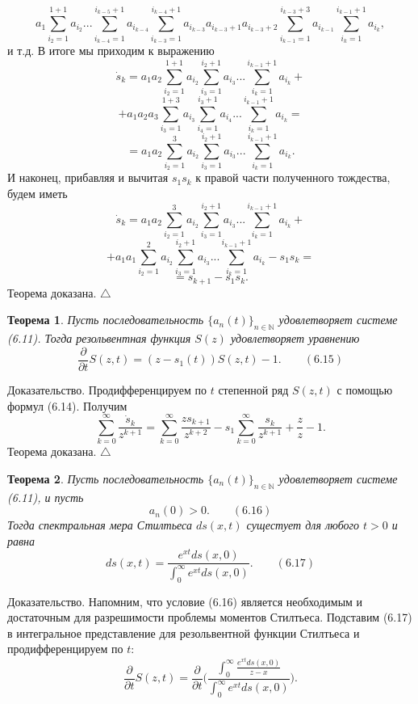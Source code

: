\documentclass[12pt,a4paper]{article}
\theoremstyle{plain}   \newtheorem{Pro}{Задача}
\newtheorem{The}{Теорема}
\begin{document}
$$
  a_1 \sum _{i_2 =1}^{1+1}a_{i_2}...
    \sum _{i_{k-4}=1}^{i_{k-5}+1}a_{i_{k-4}}
	  \sum _{i_{k-3}=1}^{i_{k-4}+1}
	    a_{i_{k-3}}a_{i_{k-3}+1}a_{i_{k-3}+2}
		  \sum _{i_{k-1}=1}^{i_{k-3}+3}a_{i_{k-1}}
		    \sum _{i_k =1}^{i_{k-1}+1}a_{i_k},
$$
и т.д. В итоге мы приходим к выражению
$$
  \dot s_k =a_1 a_2
    \sum _{i_2 =1}^{1+1}a_{i_2}
	  \sum _{i_3 =1}^{i_2 +1}a_{i_3}...
	    \sum _{i_k =1}^{i_{k-1}+1}a_{i_k}+
$$
$$
  +a_1 a_2 a_3
    \sum _{i_3 =1}^{1+3}a_{i_3}
	  \sum _{i_4 =1}^{i_3 +1}a_{i_4}...
	    \sum _{i_k =1}^{i_{k-1}+1}a_{i_k}=
$$
$$
  =a_1 a_2 \sum _{i_2 =1}^{3}a_{i_2}
    \sum _{i_3 =1}^{i_2 +1}a_{i_3}...
	  \sum _{i_k =1}^{i_{k-1}+1}a_{i_k}.
$$
И наконец, прибавляя и вычитая
$ s_1 s_k $
к правой части полученного тождества,
будем иметь
$$
  \dot s_k =a_1 a_2
    \sum _{i_2 =1}^{3}a_{i_2}
	  \sum _{i_3 =1}^{i_2 +1}a_{i_3}...
	    \sum _{i_k =1}^{i_{k-1}+1}a_{i_k}+
$$
$$
  +a_1 a_1 \sum _{i_2 =1}^{2} a_{i_2}
    \sum _{i_3 =1}^{i_2 +1}a_{i_3}...
	  \sum _{i_k =1}^{i_{k-1}+1}a_{i_k}
	    -s_1 s_k =
$$
$$
  =s_{k+1}-s_1 s_k .
$$
Теорема доказана.
$ \triangle $
\begin{The}
Пусть последовательность
$ \{ a_n (t) \} _{n \in \mathbb{N}} $
удовлетворяет системе (6.11).
Тогда резольвентная функция
$ S(z) $
удовлетворяет уравнению
$$
  \frac{\partial}{\partial t}S(z,t)=
    (z-s_1 (t))S(z,t)-1.
	  \qquad (6.15)
$$
\end{The}
{\Large Доказательство.}
Продифференцируем по
$ t $
степенной ряд
$ S(z,t) $
с помощью формул (6.14). Получим
$$
  \sum _{k=0}^{\infty}
    \frac{\dot s_k}{z^{k+1}}=
	  \sum _{k=0}^{\infty}
	    \frac{zs_{k+1}}{z^{k+2}}-s_1
		  \sum _{k=0}^{\infty}
		    \frac{s_k}{z^{k+1}}
			  +\frac{z}{z}-1.
$$
Теорема доказана.
$ \triangle $
\begin{The}
Пусть последовательность
$ \{ a_n (t) \} _{n \in \mathbb{N}} $
удовлетворяет системе (6.11), и пусть
$$
  a_n (0)>0 .
    \qquad (6.16)
$$
Тогда спектральная мера Стилтьеса
$ ds(x,t) $
сущестует для любого
$ t>0 $
и равна
$$
  ds(x,t)=\frac
    {e^{xt}ds(x,0)}
	  {\int _0 ^{\infty} e^{xt}ds(x,0)}.
	    \qquad (6.17)
$$
\end{The}
{\Large Доказательство.}
Напомним, что условие (6.16) является необходимым и достаточным
для разрешимости проблемы моментов Стилтьеса.
Подставим (6.17) в интегральное представление
для резольвентной функции Стилтьеса и продифференцируем по
$ t : $
$$
  \frac{\partial}{\partial t}S(z,t)=
    \frac{\partial}{\partial t} \Biggl (
	  \frac{\int _0 ^{\infty}
	    \frac{e^{xt}ds(x,0)}{z-x}}
	 {\int _0 ^{\infty}e^{xt}ds(x,0)} \Biggr ) .
$$
\end{document}
